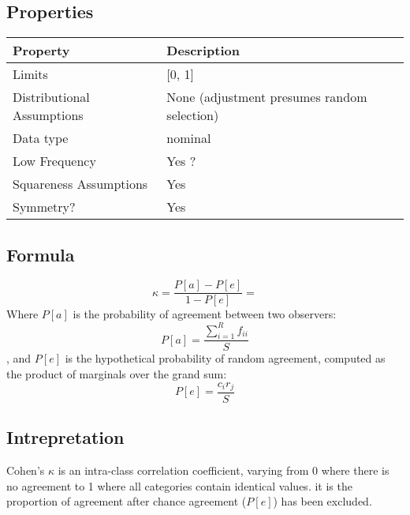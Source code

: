 \documentclass[11pt]{article}
\begin{document}
\subsection{Properties}
\begin{tabular}{| l || l |}
    \hline
    {\bf Property} & {\bf Description} \\
    \hline
    Limits & [0, 1] \\ \hline

    Distributional Assumptions & None (adjustment presumes random selection) \\ \hline

    Data type & nominal \\ \hline

    Low Frequency & Yes {\color{red}?} \\ \hline

    Squareness Assumptions & Yes \\ \hline
    
    Symmetry? & Yes \\ \hline

\end{tabular}


\subsection{Formula}
$$
\kappa = \frac{P[a] - P[e]}{1-P[e]} =
$$
Where $P[a]$ is the probability of agreement between two observers:
$$
P[a] = \frac{ \sum_{i=1}^{R}f_{ii} }{ S }
$$
, and $P[e]$ is the hypothetical probability of random agreement, computed as the product of marginals over the grand sum:
$$
P[e] = \frac{ c_i r_j }{ S }
$$

\subsection{Intrepretation}
\label{section:cohenkappa:interpretation}
Cohen's $\kappa$ is an intra-class correlation coefficient, varying from 0 where there is no agreement to 1 where all categories contain identical values.  it is the proportion of agreement after chance agreement ($P[e]$) has been excluded. 
\end{document}
